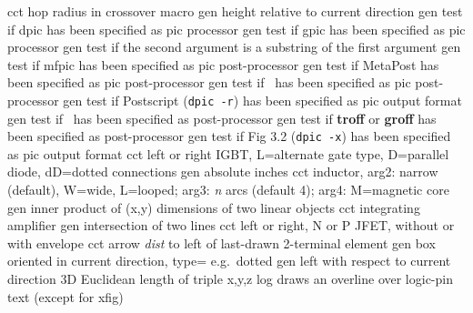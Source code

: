   {cct}
  {hop radius in crossover macro}
  {gen}
  {height relative to current direction}
  {gen}
  {test if dpic has been specified as pic processor}
  {gen}
  {test if gpic has been specified as pic processor}
  {gen}
  {test if the second argument is a substring of the first argument}
  {gen}
  {test if mfpic has been specified as pic post-processor}
  {gen}
  {test if MetaPost has been specified as pic post-processor}
  {gen}
  {test if \TPGF~has been specified as pic post-processor}
  {gen}
  {test if Postscript ({\tt dpic -r}) has been specified as pic output format}
  {gen}
  {test if \PSTricks~has been specified as post-processor}
  {gen}
  {test if {\bf troff} or {\bf groff} has been specified as post-processor}
  {gen}
  {test if Fig 3.2 ({\tt dpic -x}) has been specified as pic output format}
  {cct}
  {left or right IGBT, L=alternate gate type, D=parallel diode,
   dD=dotted connections }
  {gen}
  {absolute inches}
  {cct}
  {inductor, arg2: narrow (default), W=wide, L=looped;
   arg3: {\sl n} arcs (default 4); arg4: M=magnetic core }
  {gen}
  {inner product of (x,y) dimensions of two linear objects}
  {cct}
  {integrating amplifier}
  {gen}
  {intersection of two lines}
  {cct}
  {left or right, N or P JFET, without or with envelope}
  {cct}
  {arrow {\sl dist} to left of last-drawn 2-terminal element}
  {gen}
  {box oriented in current direction, type= e.g.\ dotted}
  {gen}
  {left with respect to current direction}
  {3D}
  {Euclidean length of triple x,y,z}
  {log}
  {draws an overline over logic-pin text (except for xfig)}
